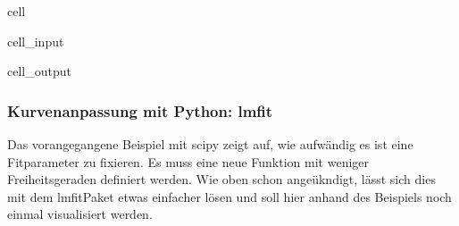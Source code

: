 \documentclass[letterpaper,10pt,english]{jupyterBook}
\begin{document}
\begin{sphinxuseclass}{cell}
\begin{sphinxVerbatimInput}
\begin{sphinxuseclass}{cell_input}
\begin{sphinxVerbatim}[commandchars=\\\{\}]
\PYG{p}{[}\PYG{p}{]}
\end{sphinxVerbatim}

\end{sphinxuseclass}\end{sphinxVerbatimInput}
\begin{sphinxVerbatimOutput}

\begin{sphinxuseclass}{cell_output}
\noindent{}

\noindent{}

\end{sphinxuseclass}\end{sphinxVerbatimOutput}

\end{sphinxuseclass}

\subsubsection{Kurvenanpassung mit Python: lmfit }
\label{\detokenize{content/1_Kurvenanpassung:kurvenanpassung-mit-python-lmfit-a-id-subsec-lmfit-bsp2-a}}
\sphinxAtStartPar
Das vorangegangene Beispiel mit scipy zeigt auf, wie aufwändig es ist eine Fitparameter zu fixieren. Es muss eine neue Funktion mit weniger Freiheitsgeraden definiert werden. Wie oben schon angeükndigt, lässt sich dies mit dem lmfit\sphinxhyphen{}Paket etwas einfacher lösen und soll hier anhand des Beispiels noch einmal visualisiert werden.
\end{document}

